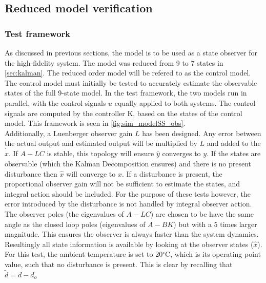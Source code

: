 \subsection{Reduced model verification}
\subsubsection{Test framework}
As discussed in previous sections, the model is to be used as a state observer for the high-fidelity system. The model was reduced from 9 to 7 states in \cref{sec:kalman}. The reduced order model will be refered to as the control model. \\

The control model must initially be tested to accurately estimate the observable states of the full 9-state model. In the test framework, the two models run in parallel, with the control signals $u$ equally applied to both systems. The control signals are computed by the controller K, based on the states of the control model. This framework is seen in \cref{fig:sim_modelSS_obs}. \\

Additionally, a Luenberger observer gain $L$ has been designed. Any error between the actual output and estimated output will be multiplied by $L$ and added to the $\dot{\hat{x}}$. If $A-LC$ is stable, this topology will ensure $\hat{y}$ converges to $y$. If the states are observable (which the Kalman Decomposition ensures) and there is no present disturbance then $\hat{x}$ will converge to $x$. If a disturbance is present, the proportional observer gain will not be sufficient to estimate the states, and integral action should be included. For the purpose of these tests however, the error introduced by the disturbance is not handled by integral observer action. \\

The observer poles (the eigenvalues of $A-LC$) are chosen to be have the same angle as the closed loop poles (eigenvalues of $A-BK$) but with a 5 times larger magnitude. This ensures the observer is always faster than the system dynamics. Resultingly all state information is available by looking at the observer states ($\hat{x}$).\\

For this test, the ambient temperature is set to 20$^{\circ}$C, which is its operating point value, such that no disturbance is present. This is clear by recalling that $\tilde{d} = d-d_o$

